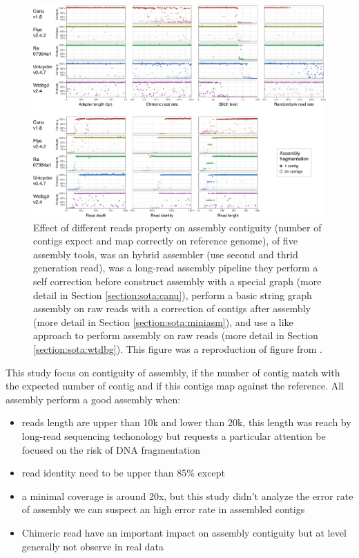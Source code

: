 \documentclass[main.tex]{subfiles}
\begin{document}
\begin{figure}
    \centering
    \includegraphics[width=\textwidth]{introduction/images/rrwick_bench.png}
    \caption{Effect of different reads property on assembly contiguity (number of contigs expect and map correctly on reference genome), of five assembly tools,  was an hybrid assembler (use second and thrid generation read), \canu was a long-read assembly pipeline they perform a self correction before construct assembly with a special \OLC graph (more detail in Section \ref{section:sota:canu}),  perform a basic string graph assembly on raw reads with a correction of contigs after assembly (more detail in Section \ref{section:sota:miniasm}), \wtdbg and  use a \DBG like approach to perform assembly on raw reads (more detail in Section \ref{section:sota:wtdbg}). This figure was a reproduction of figure from \cite{long_read_assembler_comparison}.}
    \label{intro:fig:rrwick_bench}
\end{figure}

This study focus on contiguity of assembly, if the number of contig match with the expected number of contig and if this contigs map against the reference. All assembly perform a good assembly when:
\begin{itemize}
    \item reads length are upper than 10k and lower than 20k, this length was reach by long-read sequencing techonology but requests a particular attention be focused on the risk of DNA fragmentation
    \item read identity need to be upper than 85\% except
    \item a minimal coverage is around 20x, but this study didn't analyze the error rate of assembly we can suspect an high error rate in assembled contigs
    \item Chimeric read have an important impact on assembly contiguity but at level generally not observe in real data
\end{itemize}
\end{document}
